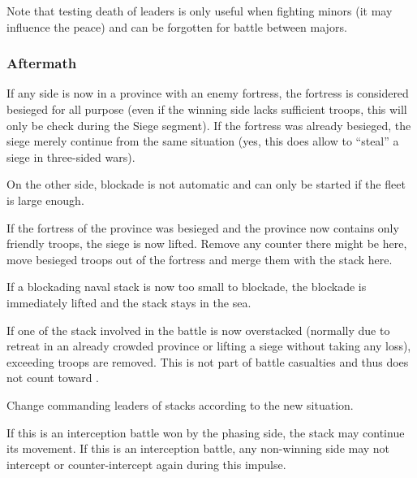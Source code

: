 Note that testing death of  leaders is only useful when
fighting minors (it may influence the peace) and can be forgotten for battle
between majors.

\subsubsection{Aftermath}
\label{chMilitary:Battle:Cleanup:Aftermath}
If any side is now in a province with an enemy fortress, the fortress is
considered besieged for all purpose (even if the winning side lacks sufficient
troops, this will only be check during the Siege segment). If the fortress was
already besieged, the siege merely continue from the same situation (yes, this
does allow to ``steal'' a siege in three-sided wars).

On the other side, blockade is not automatic and can only be started if the
fleet is large enough.

If the fortress of the province was besieged and the province now contains
only friendly troops, the siege is now lifted. Remove any \USURE counter there
might be here, move besieged troops out of the fortress and merge them with
the stack here.

If a blockading naval stack is now too small to blockade, the blockade is
immediately lifted and the stack stays in the sea.

If one of the stack involved in the battle is now overstacked (normally due to
retreat in an already crowded province or lifting a siege without taking any
loss), exceeding troops are removed. This is not part of battle casualties and
thus does not count toward .

Change commanding leaders of stacks according to the new situation.

If this is an interception battle won by the phasing side, the stack may
continue its movement. If this is an interception battle, any non-winning side
may not intercept or counter-intercept again during this impulse.

